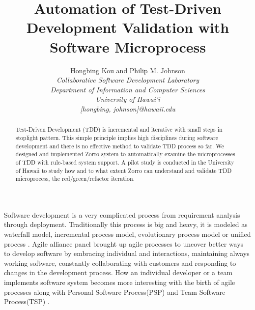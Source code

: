 \documentclass[11pt,twocolumn]{article}
\begin{document}
\title{Automation of Test-Driven Development Validation with Software Microprocess}
\author{
Hongbing Kou and Philip M. Johnson\\
\em  Collaborative Software Development Laboratory \\
\em  Department of Information and Computer Sciences \\
\em  University of Hawai'i \\
\em  [hongbing, johnson]@hawaii.edu}
\maketitle
\thispagestyle{empty}

\begin{abstract}  %
  Test-Driven Development (TDD) is incremental and iterative with small
  steps in stoplight pattern. This simple principle implies high
  disciplines during software development and there is no effective method
  to validate TDD process so far. We designed and implemented Zorro system
  to automatically examine the microprocesses of TDD with rule-based system
  support. A pilot study is conducted in the University of Hawaii to study
  how and to what extent Zorro can understand and validate TDD
  microprocess, the red/green/refactor iteration.
\end{abstract}

\label{sec:intro}
Software development is a very complicated process from requirement
analysis through deployment. Traditionally this process is big and heavy,
it is modeled as waterfall model, incremental process model, evolutionary
process model or unified process \cite{Pressman:03}. Agile alliance panel
brought up agile processes to uncover better ways to develop software by
embracing individual and interactions, maintaining always working software,
constantly collaborating with customers and responding to changes in the
development process\cite{AgileAlliance}.  How an individual developer or a
team implements software system becomes more interesting with the birth of
agile processes along with Personal Software Process(PSP) and Team Software
Process(TSP) \cite{Humphrey:99}.
\end{document}

